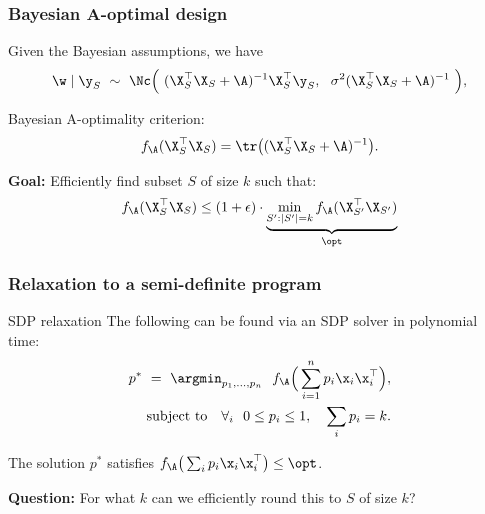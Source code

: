 \begin{frame}
  \frametitle{Bayesian A-optimal design}
Given the Bayesian assumptions, we have
  \begin{align*}
  \w\mid \y_S \ \sim\ \Nc\Big(\ (\X_S^\top\X_S + \A)^{-1}\X_S^\top\y_S
  ,\ \ \sigma^2(\X_S^\top\X_S+\A)^{-1}\ \Big),
  \end{align*}
  
  Bayesian A-optimality criterion:
\begin{align*}
f_{\A}(\X_S^\top\X_S)=\tr\big((\X_S^\top\X_S+\A)^{-1}\big).
\end{align*}

\textbf{Goal:} Efficiently find subset $S$ of size $k$ such that:
\begin{align*}
f_{\A}(\X_S^\top\X_S)\leq (1+\epsilon)\cdot\underbrace{\min_{S':|S'|=k}f_{\A}(\X_{S'}^\top\X_{S'})}_{\opt}
\end{align*}
\end{frame}

\begin{frame}
  \frametitle{Relaxation to a semi-definite program}
  \begin{block}{SDP relaxation}
The following can be found via an SDP solver in polynomial time:
  \begin{align*}
p^* \ = \  \argmin_{p_1,...,p_n}\ \
  f_{\A}\Big(\sum_{i=1}^np_i\x_i\x_i^\top\Big),\\
\text{subject to}\quad
  \forall_i\ \ 0\leq p_i\leq 1,\quad \sum_i p_i=k.
  \end{align*}
\end{block}

\pause

The solution $p^*$ satisfies $f_{\A}\big(\sum_{i}p_i \x_i \x_i^\top\big)\leq\opt$.

\pause

\textbf{Question:}
For what $k$ can we efficiently round this to $S$ of size $k$?
    
\end{frame}

